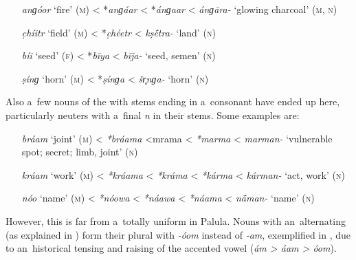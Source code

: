\begin{itemize}[itemsep=0pt, leftmargin=]
\item[\textit{anɡóor} `fire' (\textsc{m})] {\textless} *\textit{anɡáar} {\textless} *\textit{ánɡaar} {\textless} \textit{ánɡāra-} `glowing charcoal' (\textsc{m}, \textsc{n})
\item[\textit{c̣híitr} `field' (\textsc{m})] {\textless} *\textit{c̣héetr} {\textless} \textit{kṣ\'{\={e}}tra-} `land' (\textsc{n})
\item[\textit{bíi} `seed' (\textsc{f})] {\textless} *\textit{bīya} {\textless} \textit{bīǰa-} `seed, semen' (\textsc{n})
\item[\textit{ṣínɡ} `horn' (\textsc{m})] {\textless} *\textit{ṣínɡa} {\textless} \textit{šr̥nɡa-} `horn' (\textsc{n})
\end{itemize}

Also a~few nouns of the   with stems ending in a~consonant have ended up here, particularly neuters with a~final \textit{n} in their stems. Some examples are: 

\begin{itemize}[itemsep=0pt, leftmargin=]
\item[\textit{bráam} `joint' (\textsc{m})] {\textless} \textit{*bráama} {\textless*mrama} {\textless} \textit{*marma} {\textless} \textit{marman-} `vulnerable spot; secret; limb, joint' (\textsc{n})
\item[\textit{kráam} `work' (\textsc{m})] {\textless} \textit{*kráama} {\textless} \textit{*kráma} {\textless} \textit{*kárma} {\textless} \textit{kárman-} `act, work' (\textsc{n}) 
\item[\textit{nóo} `name' (\textsc{m})] {\textless} \textit{*nóowa} {\textless} \textit{*náawa} {\textless} \textit{*náama} {\textless} \textit{n\'{\={a}}man-} `name' (\textsc{n})
\end{itemize}

However, this is far from a~totally uniform  in Palula. Nouns with an~alternating  (as explained in ) form their plural  with \textit{-óom} instead of \textit{-am}, exemplified in , due to an~historical tensing and raising of the accented vowel (\textit{ám {\textgreater} áam {\textgreater} óom}). 


